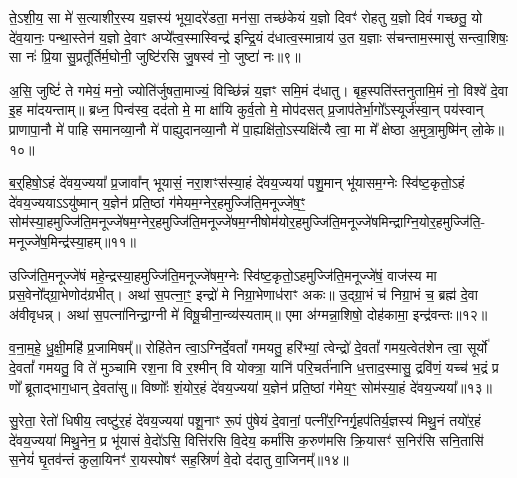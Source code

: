 ते॒\-ऽशी॒य॒ सा मे॑ स॒त्याशीर॒स्य य॒ज्ञस्य॑ भूया॒दरे॑डता॒ मन॑सा॒ तच्छ॑केयं य॒ज्ञो दिवꣳ॑ रोहतु य॒ज्ञो दिवं॑ गच्छतु॒ यो दे॑व॒यानः॒ पन्था॒स्तेन॑ य॒ज्ञो दे॒वाꣳ अप्ये᳚त्व॒स्मास्विन्द्र॑ इन्द्रि॒यं द॑धात्व॒स्मान्राय॑ उ॒त य॒ज्ञाः स॑चन्ताम॒स्मासु॑ सन्त्वा॒शिषः॒ सा नः॑ प्रि॒या सु॒प्रतू᳚र्तिर्म॒घोनी॒ जुष्टि॑रसि जु॒षस्व॑ नो॒ जुष्टा॑ नः॥९॥

अ॒सि॒ जुष्टिं॑ ते गमेयं॒ मनो॒ ज्योति॑र्जुषता॒माज्यं॒ विच्छि॑न्नं य॒ज्ञꣳ समि॒मं द॑धातु। बृह॒स्पति॑स्तनुतामि॒मं नो॒ विश्वे॑ दे॒वा इ॒ह मा॑दयन्ताम्॥ ब्रध्न॒ पिन्व॑स्व॒ दद॑तो मे॒ मा क्षा॑यि कुर्व॒तो मे॒ मोप॑दसत् प्र॒जाप॑तेर्भा॒गो᳚\-ऽस्यूर्ज॑स्वा॒न् पय॑स्वान् प्राणापा॒नौ मे॑ पाहि समानव्या॒नौ मे॑ पाह्युदानव्या॒नौ मे॑ पा॒ह्यक्षि॑तो॒\-ऽस्यक्षि॑त्यै त्वा॒ मा मे᳚ क्षेष्ठा अ॒मुत्रा॒मुष्मि॑न् लो॒के॥१०॥

{\anuvakamend[{उ॒प॒ह॒वं जुष्टा॑ नस्त्वा॒ षट् च॑॥३॥}]}

ब॒र्॒\mbox{}हिषो॒\-ऽहं दे॑वय॒ज्यया᳚ प्र॒जावा᳚न् भूयासं॒ नरा॒शꣳस॑स्या॒हं दे॑वय॒ज्यया॑ पशु॒मान् भू॑यासम॒ग्नेः स्वि॑ष्ट॒कृतो॒\-ऽहं दे॑वय॒ज्यया\-ऽ\-ऽयु॑ष्मान् य॒ज्ञेन॑ प्रति॒ष्ठां ग॑मेयम॒ग्नेर॒हमुज्जि॑ति॒मनूज्जे॑ष॒ꣳ॒ सोम॑स्या॒हमुज्जि॑ति॒मनूज्जे॑षम॒ग्नेर॒हमुज्जि॑ति॒मनूज्जे॑षम॒ग्नीषोम॑योर॒हमुज्जि॑ति॒मनूज्जे॑षमिन्द्राग्नि॒योर॒हमुज्जि॑ति॒- मनूज्जे॑ष॒मिन्द्र॑स्या॒हम्॥११॥

उज्जि॑ति॒मनूज्जे॑षं महे॒न्द्रस्या॒हमुज्जि॑ति॒मनूज्जे॑षम॒ग्नेः स्वि॑ष्ट॒कृतो॒\-ऽहमुज्जि॑ति॒मनूज्जे॑षं॒ वाज॑स्य मा प्रस॒वेनो᳚द्ग्रा॒भेणोद॑ग्रभीत्। अथा॑ स॒पत्ना॒ꣳ॒ इन्द्रो॑ मे निग्रा॒भेणाध॑राꣳ अकः॥ उ॒द्ग्रा॒भं च॑ निग्रा॒भं च॒ ब्रह्म॑ दे॒वा अ॑वीवृधन्न्। अथा॑ स॒पत्ना॑निन्द्रा॒ग्नी मे॑ विषू॒चीना॒न्व्य॑स्यताम्॥ एमा अ॑ग्मन्ना॒शिषो॒ दोह॑कामा॒ इन्द्र॑वन्तः॥१२॥

व॒ना॒म॒हे॒ धु॒क्षी॒महि॑ प्र॒जामिषम्᳚॥ रोहि॑तेन त्वा॒\-ऽग्निर्दे॒वतां᳚ गमयतु॒ हरि॑भ्यां॒ त्वेन्द्रो॑ दे॒वतां᳚ गमय॒त्वेत॑शेन त्वा॒ सूर्यो॑ दे॒वतां᳚ गमयतु॒ वि ते॑ मुञ्चामि रश॒ना वि र॒श्मीन् वि योक्त्रा॒ यानि॑ परि॒चर्त॑नानि ध॒त्ताद॒स्मासु॒ द्रवि॑णं॒ यच्च॑ भ॒द्रं प्र णो᳚ ब्रूताद्भाग॒धान् दे॒वता॑सु॥ विष्णोः᳚ शं॒योर॒हं दे॑वय॒ज्यया॑ य॒ज्ञेन॑ प्रति॒ष्ठां ग॑मेय॒ꣳ॒ सोम॑स्या॒हं दे॑वय॒ज्यया᳚॥१३॥

सु॒रेता॒ रेतो॑ धिषीय॒ त्वष्टु॑र॒हं दे॑वय॒ज्यया॑ पशू॒नाꣳ रू॒पं पु॑षेयं दे॒वानां॒ पत्नी॑र॒ग्निर्गृ॒हप॑तिर्य॒ज्ञस्य॑ मिथु॒नं तयो॑र॒हं दे॑वय॒ज्यया॑ मिथु॒नेन॒ प्र भू॑यासं वे॒दो॑\-ऽसि॒ वित्ति॑रसि वि॒देय॒ कर्मा॑सि क॒रुण॑मसि क्रि॒यासꣳ॑ स॒निर॑सि सनि॒तासि॑ स॒नेयं॑ घृ॒तव॑न्तं कुला॒यिनꣳ॑ रा॒यस्पोषꣳ॑ सह॒स्रिणं॑ वे॒दो द॑दातु वा॒जिनम्᳚॥१४॥

{\anuvakamend[{इन्द्र॑स्या॒हमिन्द्र॑वन्तः॒ सोम॑स्या॒हं दे॑वय॒ज्यया॒ चतु॑श्चत्वारिꣳशच्च॥४॥}]}

